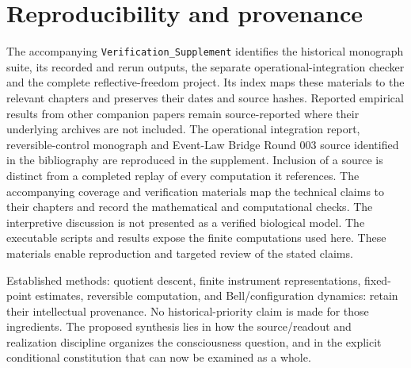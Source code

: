 \section{Reproducibility and provenance}\label{section:ledger:reproducibility-and-provenance}
The accompanying \texttt{Verification\_Supplement} identifies the historical monograph suite, its recorded and rerun outputs, the separate operational-integration checker and the complete reflective-freedom project. Its index maps these materials to the relevant chapters and preserves their dates and source hashes. Reported empirical results from other companion papers remain source-reported where their underlying archives are not included. The operational integration report, reversible-control monograph and Event-Law Bridge Round 003 source identified in the bibliography are reproduced in the supplement. Inclusion of a source is distinct from a completed replay of every computation it references.
\enlargethispage{\baselineskip}
The accompanying coverage and verification materials map the technical claims to their chapters and record the mathematical and computational checks. The interpretive discussion is not presented as a verified biological model. The executable scripts and results expose the finite computations used here. These materials enable reproduction and targeted review of the stated claims.

Established methods: quotient descent, finite instrument representations, fixed-point estimates, reversible computation, and Bell/configuration dynamics: retain their intellectual provenance. No historical-priority claim is made for those ingredients. The proposed synthesis lies in how the source/readout and realization discipline organizes the consciousness question, and in the explicit conditional constitution that can now be examined as a whole.

\backmatter
\apptocmd{\thebibliography}{\small\setlength{\itemsep}{0pt}\setlength{\parsep}{0pt}}{}{}




